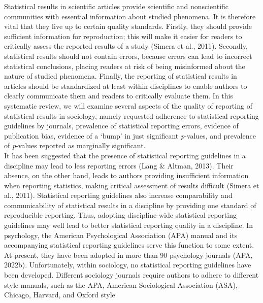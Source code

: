 \documentclass[
  12pt,
]{article}
\begin{document}
Statistical results in scientific articles provide scientific and
nonscientific communities with essential information about studied
phenomena. It is therefore vital that they live up to certain quality
standards. Firstly, they should provide sufficient information for
reproduction; this will make it easier for readers to critically assess
the reported results of a study (Simera et al., 2011). Secondly,
statistical results should not contain errors, because errors can lead
to incorrect statistical conclusions, placing readers at risk of being
misinformed about the nature of studied phenomena. Finally, the
reporting of statistical results in articles should be standardized at
least within disciplines to enable authors to clearly communicate them
and readers to critically evaluate them. In this systematic review, we
will examine several aspects of the quality of reporting of statistical
results in sociology, namely requested adherence to statistical
reporting guidelines by journals, prevalence of statistical reporting
errors, evidence of publication bias, evidence of a `bump' in just
significant \emph{p}-values, and prevalence of \emph{p}-values reported
as marginally significant.\\
\hspace*{0.333em}\hspace*{0.333em}\hspace*{0.333em}\hspace*{0.333em}It
has been suggested that the presence of statistical reporting guidelines
in a discipline may lead to less reporting errors (Lang \& Altman,
2013). Their absence, on the other hand, leads to authors providing
insufficient information when reporting statistics, making critical
assessment of results difficult (Simera et al., 2011). Statistical
reporting guidelines also increase comparability and communicability of
statistical results in a discipline by providing one standard of
reproducible reporting. Thus, adopting discipline-wide statistical
reporting guidelines may well lead to better statistical reporting
quality in a discipline. In psychology, the American Psychological
Association (APA) manual and its accompanying statistical reporting
guidelines serve this function to some extent. At present, they have
been adopted in more than 90 psychology journals (APA, 2022b).
Unfortunately, within sociology, no statistical reporting guidelines
have been developed. Different sociology journals require authors to
adhere to different style manuals, such as the APA, American
Sociological Association (ASA), Chicago, Harvard, and Oxford style
\end{document}
